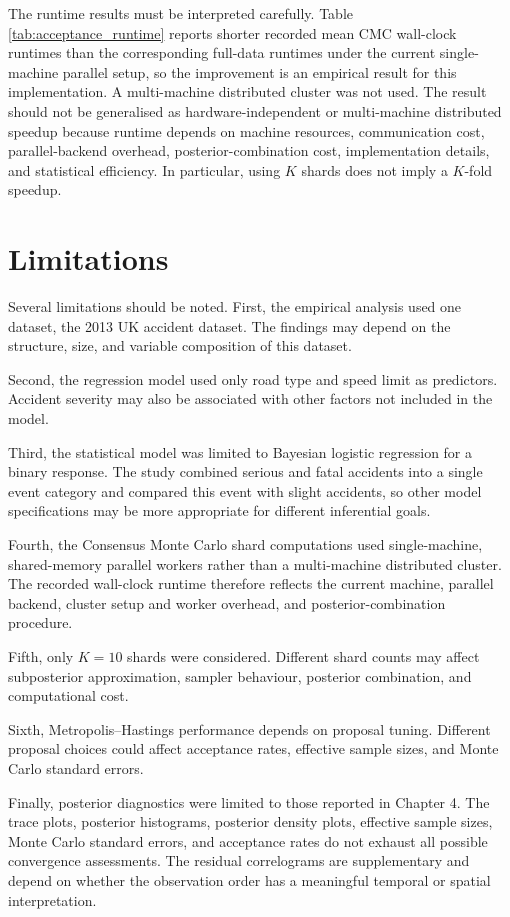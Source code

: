The runtime results must be interpreted carefully. Table \ref{tab:acceptance_runtime} reports shorter recorded mean CMC wall-clock runtimes than the corresponding full-data runtimes under the current single-machine parallel setup, so the improvement is an empirical result for this implementation. A multi-machine distributed cluster was not used. The result should not be generalised as hardware-independent or multi-machine distributed speedup because runtime depends on machine resources, communication cost, parallel-backend overhead, posterior-combination cost, implementation details, and statistical efficiency. In particular, using $K$ shards does not imply a $K$-fold speedup.

\section{Limitations}

Several limitations should be noted. First, the empirical analysis used one dataset, the 2013 UK accident dataset. The findings may depend on the structure, size, and variable composition of this dataset.

Second, the regression model used only road type and speed limit as predictors. Accident severity may also be associated with other factors not included in the model.

Third, the statistical model was limited to Bayesian logistic regression for a binary response. The study combined serious and fatal accidents into a single event category and compared this event with slight accidents, so other model specifications may be more appropriate for different inferential goals.

Fourth, the Consensus Monte Carlo shard computations used single-machine, shared-memory parallel workers rather than a multi-machine distributed cluster. The recorded wall-clock runtime therefore reflects the current machine, parallel backend, cluster setup and worker overhead, and posterior-combination procedure.

Fifth, only $K=10$ shards were considered. Different shard counts may affect subposterior approximation, sampler behaviour, posterior combination, and computational cost.

Sixth, Metropolis--Hastings performance depends on proposal tuning. Different proposal choices could affect acceptance rates, effective sample sizes, and Monte Carlo standard errors.

Finally, posterior diagnostics were limited to those reported in Chapter 4. The trace plots, posterior histograms, posterior density plots, effective sample sizes, Monte Carlo standard errors, and acceptance rates do not exhaust all possible convergence assessments. The residual correlograms are supplementary and depend on whether the observation order has a meaningful temporal or spatial interpretation.

